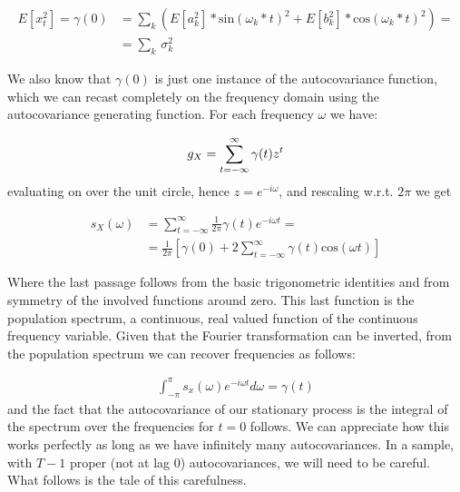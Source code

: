 \documentclass[12pt]{article} %
\begin{document}
\begin{equation}
\begin{aligned}
E[x_t^2]=\gamma(0)&=\sum_k(E[a_k^2]*\text{sin}(\omega_k*t)^2+E[b_k^2]*\text{cos}(\omega_k*t)^2)=\\
&=\sum_k\,\sigma_k^2
\end{aligned}
\end{equation}

We also know that $\gamma(0)$ is just one instance of the autocovariance function, which we can recast completely on the frequency domain using the autocovariance generating function. For each frequency $\omega$ we have:

\begin{equation}
g_X=\sum\limits_{t=-\infty}^{\infty} \gamma(t)z^t \\
\end{equation}evaluating on over the unit circle, hence $z=e^{-i\omega}$, and rescaling w.r.t. $2\pi$ we get

\begin{equation}
\begin{aligned}
s_X(\omega)&=\sum\limits_{t=-\infty}^{\infty} \frac{1}{2\pi} \gamma(t)e^{-i\omega t}=\\
&=\frac{1}{2\pi}\left[\gamma(0)+2\sum\limits_{t=-\infty}^{\infty} \gamma(t)\text{cos}(\omega t)\right]
\end{aligned}
\end{equation}

Where the last passage follows from the basic trigonometric identities and from symmetry of the involved functions around zero. This last function is the population spectrum, a continuous, real valued function of the continuous frequency variable. Given that the Fourier transformation can be inverted, from the population spectrum we can recover frequencies as follows:

\begin{equation}
\begin{aligned}
\int_{-\pi}^{\pi} s_x(\omega)e^{-i\omega t}d\omega=\gamma(t)
\end{aligned}
\end{equation}and the fact that the autocovariance of our stationary process is the integral of the spectrum over the frequencies for $t=0$ follows. We can appreciate how this works perfectly as long as we have infinitely many autocovariances. In a sample, with $T-1$ proper (not at lag 0) autocovariances, we will need to be careful. What follows is the tale of this carefulness. 
\end{document}
